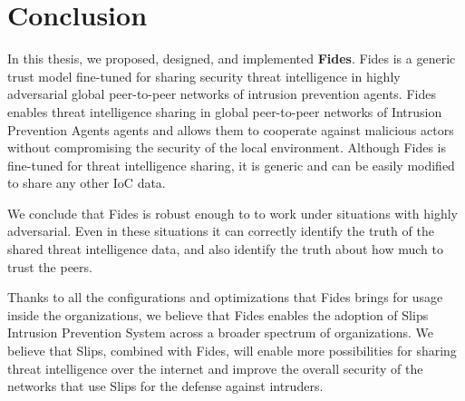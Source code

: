 \chapter{Conclusion}
\label{ch:conclusion}

In this thesis, we proposed, designed, and implemented \textbf{Fides}. Fides is a generic trust model fine-tuned for sharing security threat intelligence in highly adversarial global peer-to-peer networks of intrusion prevention agents.
Fides enables threat intelligence sharing in global peer-to-peer networks of Intrusion Prevention Agents agents and allows them to cooperate against malicious actors without compromising the security of the local environment. 
Although Fides is fine-tuned for threat intelligence sharing, it is generic and can be easily modified to share any other IoC data.

We conclude that Fides is robust enough to to work under situations with highly adversarial. Even in these situations it can correctly identify the truth of the shared threat intelligence data, and also identify the truth about how much to trust the peers.

Thanks to all the configurations and optimizations that Fides brings for usage inside the organizations, we believe that Fides enables the adoption of Slips Intrusion Prevention System across a broader spectrum of organizations.
We believe that Slips, combined with Fides, will enable more possibilities for sharing threat intelligence over the internet and improve the overall security of the networks that use Slips for the defense against intruders.


